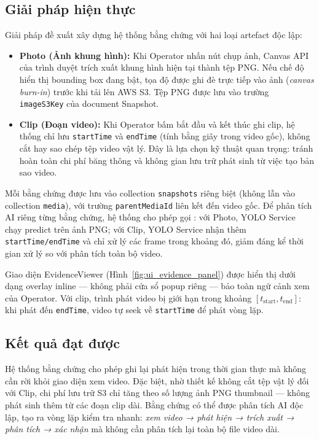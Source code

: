 \documentclass[../DoAn.tex]{subfiles}
\begin{document}
\subsection{Giải pháp hiện thực}
Giải pháp đề xuất xây dựng hệ thống bằng chứng với hai loại artefact độc lập:

\begin{itemize}[leftmargin=*, topsep=4pt, itemsep=2pt]
    \item \textbf{Photo (Ảnh khung hình):} Khi Operator nhấn nút chụp ảnh, Canvas API của trình duyệt trích xuất khung hình hiện tại thành tệp PNG. Nếu chế độ hiển thị bounding box đang bật, tọa độ được ghi đè trực tiếp vào ảnh (\textit{canvas burn-in}) trước khi tải lên AWS S3. Tệp PNG được lưu vào trường \texttt{imageS3Key} của document Snapshot.

    \item \textbf{Clip (Đoạn video):} Khi Operator bấm bắt đầu và kết thúc ghi clip, hệ thống chỉ lưu \texttt{startTime} và \texttt{endTime} (tính bằng giây trong video gốc), không cắt hay sao chép tệp video vật lý. Đây là lựa chọn kỹ thuật quan trọng: tránh hoàn toàn chi phí băng thông và không gian lưu trữ phát sinh từ việc tạo bản sao video.
\end{itemize}

Mỗi bằng chứng được lưu vào collection \texttt{snapshots} riêng biệt (không lẫn vào collection \texttt{media}), với trường \texttt{parentMediaId} liên kết đến video gốc. Để phân tích AI riêng từng bằng chứng, hệ thống cho phép gọi : với Photo, YOLO Service chạy predict trên ảnh PNG; với Clip, YOLO Service nhận thêm \texttt{startTime/endTime} và chỉ xử lý các frame trong khoảng đó, giảm đáng kể thời gian xử lý so với phân tích toàn bộ video.

Giao diện EvidenceViewer (Hình~\ref{fig:ui_evidence_panel}) được hiển thị dưới dạng overlay inline — không phải cửa sổ popup riêng — bảo toàn ngữ cảnh xem của Operator. Với clip, trình phát video bị giới hạn trong khoảng $[t_{\text{start}}, t_{\text{end}}]$: khi phát đến \texttt{endTime}, video tự seek về \texttt{startTime} để phát vòng lặp.

\subsection{Kết quả đạt được}
Hệ thống bằng chứng cho phép ghi lại phát hiện trong thời gian thực mà không cần rời khỏi giao diện xem video. Đặc biệt, nhờ thiết kế không cắt tệp vật lý đối với Clip, chi phí lưu trữ S3 chỉ tăng theo số lượng ảnh PNG thumbnail — không phát sinh thêm từ các đoạn clip dài. Bằng chứng có thể được phân tích AI độc lập, tạo ra vòng lặp kiểm tra nhanh: \textit{xem video → phát hiện → trích xuất → phân tích → xác nhận} mà không cần phân tích lại toàn bộ file video dài.
\end{document}
